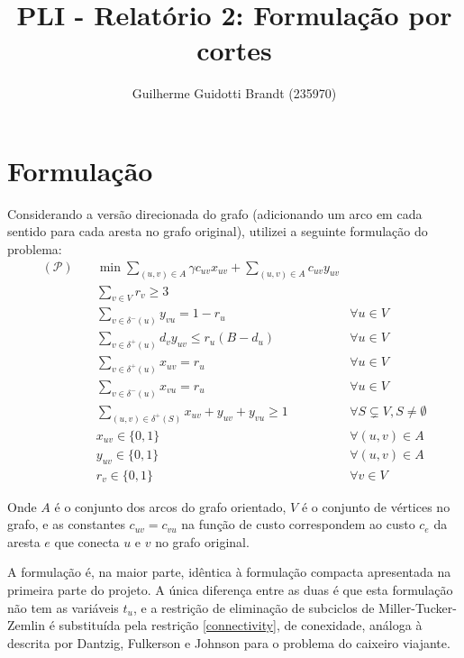 \documentclass{article}
\title{PLI - Relatório 2: Formulação por cortes}
\author{Guilherme Guidotti Brandt (235970)}
\date{}
\begin{document}
\maketitle

\section{Formulação}

Considerando a versão direcionada do grafo (adicionando um arco em cada sentido para cada aresta no grafo original), utilizei a seguinte formulação do problema:
\begin{align}
    (\mathcal{P})\quad
    &\min \sum_{(u, v) \in A} \gamma c_{uv} x_{uv} + \sum_{(u, v) \in A} c_{uv} y_{uv}\nonumber\\
    &\sum_{v \in V} r_{v} \geq 3
        \label{min-partitions}\\
    &\sum_{v \in \delta^-(u)} y_{vu} = 1 - r_u
        &\forall u \in V\label{star-in-degree}\\
    &\sum_{v \in \delta^+(u)} d_v y_{uv} \leq r_u (B - d_u)
        &\forall u \in V\label{partition-packing}\\
    &\sum_{v \in \delta^+(u)} x_{uv} = r_u
        &\forall u \in V\label{circuit-out-degree}\\
    &\sum_{v \in \delta^-(u)} x_{vu} = r_u
        &\forall u \in V\label{circuit-in-degree}\\
    &\sum_{(u, v) \in \delta^+(S)} x_{uv} + y_{uv} + y_{vu} \geq 1
        &\forall S \subsetneq V, S \neq \emptyset\label{connectivity}\\
    &x_{uv} \in \{0, 1\}&\forall (u, v) \in A\nonumber\\
    &y_{uv} \in \{0, 1\}&\forall (u, v) \in A\nonumber\\
    &r_{v} \in \{0, 1\}&\forall v \in V\nonumber
\end{align}

Onde $A$ é o conjunto dos arcos do grafo orientado, $V$ é o conjunto de vértices no grafo, e as constantes $c_{uv} = c_{vu}$ na função de custo correspondem ao custo $c_e$ da aresta $e$ que conecta $u$ e $v$ no grafo original.

A formulação é, na maior parte, idêntica à formulação compacta apresentada na primeira parte do projeto. A única diferença entre as duas é que esta formulação não tem as variáveis $t_u$, e a restrição de eliminação de subciclos de Miller-Tucker-Zemlin é substituída pela restrição \ref{connectivity}, de conexidade, análoga à descrita por Dantzig, Fulkerson e Johnson para o problema do caixeiro viajante.
\end{document}
